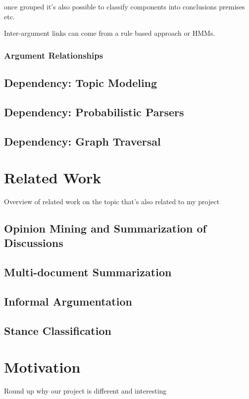         once grouped it's also possible to classify components into conclusions premises etc.

        Inter-argument links can come from a rule based approach or HMMs.

      \subsubsection{Argument Relationships}
    \subsection{Dependency: Topic Modeling}
    \subsection{Dependency: Probabilistic Parsers}
    \subsection{Dependency: Graph Traversal}


  \section{Related Work}
    Overview of related work on the topic that's also related to my project
    \subsection{Opinion Mining and Summarization of Discussions}
    \subsection{Multi-document Summarization}
    \subsection{Informal Argumentation}
    \subsection{Stance Classification}
  \section{Motivation}
    Round up why our project is different and interesting
